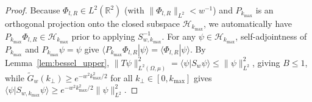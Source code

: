 \documentclass[aps,pra,onecolumn,notitlepage,11pt,tightenlines,nofootinbib,floatfix,longbibliography]{revtex4-2}
\theoremstyle{remark}
\newcommand{\braket}[2]{\langle #1 | #2 \rangle}
\newcommand{\norm}[1]{\lVert #1 \rVert}
\begin{document}
\begin{proof}
Because $\Phi_{l,R} \in L^2(\mathbb{R}^2)$ (with $\norm{\Phi_{l,R}}_{L^2} < w^{-1}$) and $P_{k_{\max}}$ is an orthogonal projection onto the closed subspace $\mathcal{H}_{k_{\max}}$, we automatically have $P_{k_{\max}}\Phi_{l,R} \in \mathcal{H}_{k_{\max}}$ prior to applying $S_{w,k_{\max}}^{-1}$. For any $\psi \in \mathcal{H}_{k_{\max}}$, self-adjointness of $P_{k_{\max}}$ and $P_{k_{\max}}\psi = \psi$ give $\braket{P_{k_{\max}}\Phi_{l,R}}{\psi} = \braket{\Phi_{l,R}}{\psi}$. By Lemma~\ref{lem:bessel_upper}, $\norm{T\psi}_{L^2(\Omega,\mu)}^2 = \braket{\psi}{S_w\psi} \le \norm{\psi}_{L^2}^2$, giving $B \le 1$, while $\widetilde{G}_w(k_\perp) \ge e^{-w^2 k_{\max}^2/2}$ for all $k_\perp \in [0,k_{\max}]$ gives $\braket{\psi}{S_{w,k_{\max}}\psi} \ge e^{-w^2 k_{\max}^2/2}\norm{\psi}_{L^2}^2$.


\end{proof}
\end{document}
